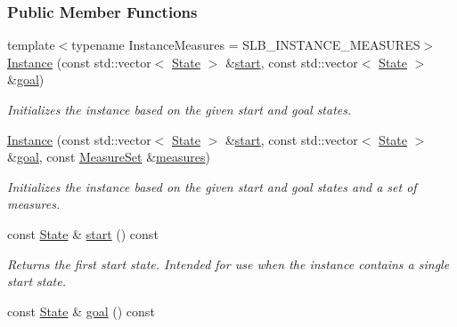 \subsubsection*{Public Member Functions}
\begin{DoxyCompactItemize}
\item 
{\footnotesize template$<$typename Instance\+Measures  = S\+L\+B\+\_\+\+I\+N\+S\+T\+A\+N\+C\+E\+\_\+\+M\+E\+A\+S\+U\+R\+ES$>$ }\\\hyperlink{structInstance_a922e555879e64b63dc512888b82c6259}{Instance} (const std\+::vector$<$ \hyperlink{structInstance_a464461e0e371f5f3af9e228751ed265e}{State} $>$ \&\hyperlink{structInstance_a9f799176ee04b2acecf79eda8ee1335d}{start}, const std\+::vector$<$ \hyperlink{structInstance_a464461e0e371f5f3af9e228751ed265e}{State} $>$ \&\hyperlink{structInstance_a9a8dc973e14c1fc73e28e8e6ae2e5136}{goal})
\begin{DoxyCompactList}\small\item\em Initializes the instance based on the given start and goal states. \end{DoxyCompactList}\item 
\hyperlink{structInstance_a4870d73937d164b5e5c0ba8506a06590}{Instance} (const std\+::vector$<$ \hyperlink{structInstance_a464461e0e371f5f3af9e228751ed265e}{State} $>$ \&\hyperlink{structInstance_a9f799176ee04b2acecf79eda8ee1335d}{start}, const std\+::vector$<$ \hyperlink{structInstance_a464461e0e371f5f3af9e228751ed265e}{State} $>$ \&\hyperlink{structInstance_a9a8dc973e14c1fc73e28e8e6ae2e5136}{goal}, const \hyperlink{structMeasureSet}{Measure\+Set} \&\hyperlink{structInstance_a907e9f6f47fefc825a390699a7aeeb53}{measures})
\begin{DoxyCompactList}\small\item\em Initializes the instance based on the given start and goal states and a set of measures. \end{DoxyCompactList}\item 
const \hyperlink{structInstance_a464461e0e371f5f3af9e228751ed265e}{State} \& \hyperlink{structInstance_a9f799176ee04b2acecf79eda8ee1335d}{start} () const 
\begin{DoxyCompactList}\small\item\em Returns the first start state. Intended for use when the instance contains a single start state. \end{DoxyCompactList}\item 
const \hyperlink{structInstance_a464461e0e371f5f3af9e228751ed265e}{State} \& \hyperlink{structInstance_a9a8dc973e14c1fc73e28e8e6ae2e5136}{goal} () const 

\end{DoxyCompactItemize}
